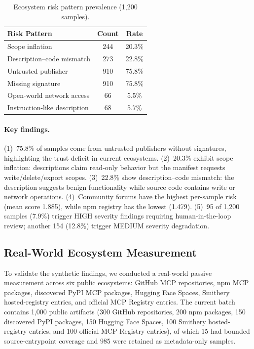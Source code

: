 \documentclass[10pt]{article}
\begin{document}
\begin{table}[t]
\centering
\caption{Ecosystem risk pattern prevalence (1{,}200 samples).}
\label{tab:ecosystem}
\begin{tabular}{lcc}
\toprule
Risk Pattern & Count & Rate \\
\midrule
Scope inflation & 244 & 20.3\% \\
Description--code mismatch & 273 & 22.8\% \\
Untrusted publisher & 910 & 75.8\% \\
Missing signature & 910 & 75.8\% \\
Open-world network access & 66 & 5.5\% \\
Instruction-like description & 68 & 5.7\% \\
\bottomrule
\end{tabular}
\end{table}

\paragraph{Key findings.}
(1)~75.8\% of samples come from untrusted publishers without signatures, highlighting the trust deficit in current ecosystems.
(2)~20.3\% exhibit scope inflation: descriptions claim read-only behavior but the manifest requests write/delete/export scopes.
(3)~22.8\% show description--code mismatch: the description suggests benign functionality while source code contains write or network operations.
(4)~Community forums have the highest per-sample risk (mean score 1.885), while npm registry has the lowest (1.479).
(5)~95 of 1{,}200 samples (7.9\%) trigger HIGH severity findings requiring human-in-the-loop review; another 154 (12.8\%) trigger MEDIUM severity degradation.

\subsection{Real-World Ecosystem Measurement}

To validate the synthetic findings, we conducted a real-world passive measurement across six public ecosystems: GitHub MCP repositories, npm MCP packages, discovered PyPI MCP packages, Hugging Face Spaces, Smithery hosted-registry entries, and official MCP Registry entries. The current batch contains 1{,}000 public artifacts (300 GitHub repositories, 200 npm packages, 150 discovered PyPI packages, 150 Hugging Face Spaces, 100 Smithery hosted-registry entries, and 100 official MCP Registry entries), of which 15 had bounded source-entrypoint coverage and 985 were retained as metadata-only samples.
\end{document}
